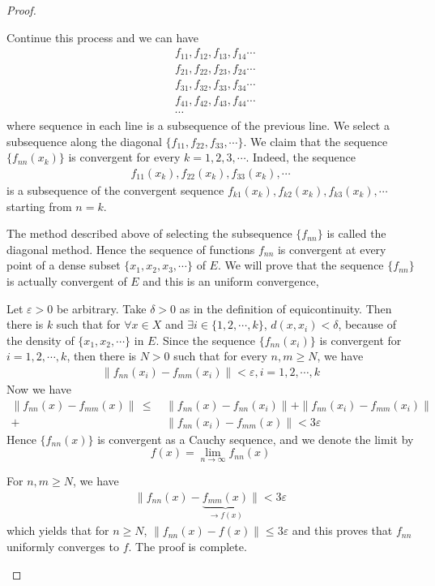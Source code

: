 \documentclass[12pt,leqno]{amsart}
\theoremstyle{definition}
\numberwithin{equation}{subsection}
\begin{document}
\begin{proof}
\begin{enumerate}
    Continue this process and we can have
    \begin{align*}
        & f_{11}, f_{12}, f_{13}, f_{14} \cdots \\
        & f_{21}, f_{22}, f_{23}, f_{24}\cdots \\
        & f_{31}, f_{32}, f_{33}, f_{34}\cdots \\
        & f_{41}, f_{42}, f_{43}, f_{44}\cdots \\
        & \cdots
    \end{align*}
    where sequence in each line is a subsequence of the previous line. We select a subsequence along the diagonal  $\{f_{11}, f_{22}, f_{33},\cdots\}$. We claim that the sequence $\{f_{nn}(x_k)\}$ is convergent for every $k = 1,2,3,\cdots$. Indeed, the sequence 
    \begin{align*}
        f_{11}(x_k), f_{22}(x_k), f_{33}(x_k),\cdots
    \end{align*}
    is a subsequence of the convergent sequence $f_{k1}(x_k), f_{k2}(x_k), f_{k3}(x_k),\cdots$ starting from $n = k$. 
    
    The method described above of selecting the subsequence $\{f_{nn}\}$ is called the diagonal method. Hence the sequence of functions $f_{nn}$ is convergent at every point of a dense subset $\{x_1, x_2, x_3,\cdots\}$ of $E$. We will prove that the sequence $\{f_{nn}\}$ is actually convergent of $E$ and this is an uniform convergence, 
    
    Let $\varepsilon > 0$ be arbitrary. Take $\delta > 0$ as in the definition of equicontinuity. Then there is $k$ such that for $\forall x\in X$ and $\exists i \in \{1,2,\cdots, k\}$, $d(x,x_i) < \delta$, because of the density of $\{x_1, x_2, \cdots \}$ in $E$. Since the sequence $\{f_{nn}(x_i)\}$ is convergent for $i = 1,2,\cdots,k$, then there is $N > 0$ such that for every $n,m \geq N$, we have
    \begin{align*}
        \|f_{nn}(x_i) - f_{mm}(x_i)\| < \varepsilon, i = 1,2,\cdots,k
    \end{align*}
    Now we have
    \begin{align*}
        \|f_{nn}(x) - f_{mm}(x)\| \, \leq\, & \|f_{nn}(x) - f_{nn}(x_i)\| + \|f_{nn}(x_i) - f_{mm}(x_i)\| \\
        + & \|f_{nn}(x_i) - f_{mm}(x)\| < 3\varepsilon
    \end{align*}
    Hence $\{f_{nn}(x)\}$ is convergent as a Cauchy sequence, and we denote the limit by 
    $$f(x) = \lim_{n\to\infty}f_{nn}(x)$$
    
    For $n, m \geq N$, we have 
    \begin{align*}
        \|f_{nn}(x) - \underbrace{f_{mm}(x)}_{\to f(x)} \| < 3\varepsilon
    \end{align*}
    which yields that for $n \geq N$, $\|f_{nn}(x) - f(x) \|\leq 3\varepsilon$ and this proves that $f_{nn}$ uniformly converges to $f$. The proof is complete.
\end{enumerate} 
\end{proof}
\end{document}
